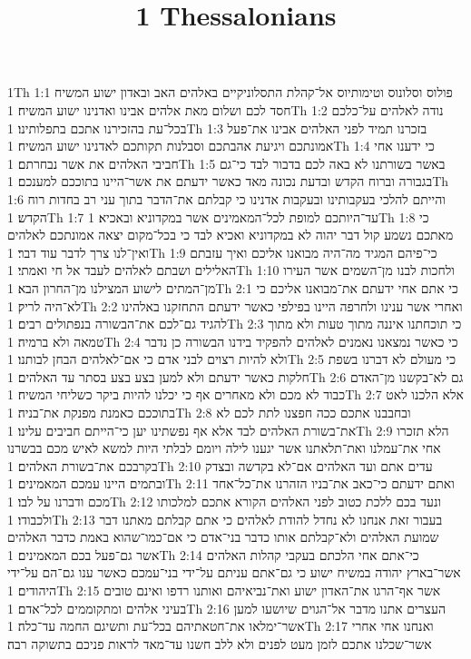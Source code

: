 

\title{1 Thessalonians}

1Th 1:1  פולוס וסלונוס וטימותיוס אל־קהלת התסלוניקיים באלהים האב ובאדון ישוע המשיח חסד לכם ושלום מאת אלהים אבינו ואדנינו ישוע המשיח׃
1Th 1:2  נודה לאלהים על־כלכם בכל־עת בהזכירנו אתכם בתפלותינו׃
1Th 1:3  בזכרנו תמיד לפני האלהים אבינו את־פעל אמונתכם ויגיעת אהבתכם וסבלנות תקותכם לאדנינו ישוע המשיח׃
1Th 1:4  כי ידענו אחי חביבי האלהים את אשר נבחרתם׃
1Th 1:5  באשר בשורתנו לא באה לכם בדבור לבד כי־גם בגבורה וברוח הקדש ובדעת נכונה מאד כאשר ידעתם את אשר־היינו בתוככם למענכם׃
1Th 1:6  והייתם להלכי בעקבותינו ובעקבות אדנינו כי קבלתם את־הדבר בתוך עני רב בחדות רוח הקדש׃
1Th 1:7  עד־היותכם למופת לכל־המאמינים אשר במקדוניא ובאכיא׃
1Th 1:8  כי מאתכם נשמע קול דבר יהוה לא במקדוניא ואכיא לבד כי בכל־מקום יצאה אמונתכם לאלהים ואין־לנו צרך לדבר עוד דבר׃
1Th 1:9  כי־פיהם המגיד מה־היה מבואנו אליכם ואיך עזבתם האלילים ושבתם לאלהים לעבד אל חי ואמתי׃
1Th 1:10  ולחכות לבנו מן־השמים אשר העירו מן־המתים לישוע המצילנו מן־החרון הבא׃
1Th 2:1  כי אתם אחי ידעתם את־מבואנו אליכם כי לא־היה לריק׃
1Th 2:2  ואחרי אשר ענינו ולחרפה היינו בפילפי כאשר ידעתם התחזקנו באלהינו להגיד גם־לכם את־הבשורה בנפתולים רבים׃
1Th 2:3  כי תוכחתנו איננה מתוך טעות ולא מתוך טמאה ולא ברמיה׃
1Th 2:4  כי כאשר נמצאנו נאמנים לאלהים להפקיד בידנו הבשורה כן נדבר ולא להיות רצוים לבני אדם כי אם־לאלהים הבחן לבותנו׃
1Th 2:5  כי מעולם לא דברנו בשפת חלקות כאשר ידעתם ולא למען בצע בצע בסתר עד האלהים׃
1Th 2:6  גם לא־בקשנו מן־האדם כבוד לא מכם ולא מאחרים אף כי יכלנו להיות ביקר כשליחי המשיח׃
1Th 2:7  אלא הלכנו לאט בתוככם כאמנת מפנקת את־בניה׃
1Th 2:8  ובחבבנו אתכם ככה חפצנו לתת לכם לא את־בשורת האלהים לבד אלא אף נפשתינו יען כי־הייתם חביבים עלינו׃
1Th 2:9  הלא תזכרו אחי את־עמלנו ואת־תלאתנו אשר יגענו לילה ויומם לבלתי היות למשא לאיש מכם בבשרנו בקרבכם את־בשורת האלהים׃
1Th 2:10  עדים אתם ועד האלהים אם־לא בקדשה ובצדק ובתמים היינו עמכם המאמינים׃
1Th 2:11  ואתם ידעתם כי־כאב את־בניו הזהרנו את־כל־אחד מכם ודברנו על לבו׃
1Th 2:12  ונעד בכם ללכת כטוב לפני האלהים הקורא אתכם למלכותו ולכבודו׃
1Th 2:13  בעבור זאת אנחנו לא נחדל להודת לאלהים כי אתם קבלתם מאתנו דבר שמועת האלהים ולא־קבלתם אותו כדבר בני־אדם כי אם־כמו־שהוא באמת כדבר האלהים אשר גם־פעל בכם המאמינים׃
1Th 2:14  כי־אתם אחי הלכתם בעקבי קהלות האלהים אשר־בארץ יהודה במשיח ישוע כי גם־אתם עניתם על־ידי בני־עמכם כאשר ענו גם־הם על־ידי היהודים׃
1Th 2:15  אשר אף־הרגו את־האדון ישוע ואת־נביאיהם ואותנו רדפו ואינם טובים בעיני אלהים ומתקוממים לכל־אדם׃
1Th 2:16  העצרים אתנו מדבר אל־הגוים שיושעו למען אשר־ימלאו את־חטאתיהם בכל־עת ותשיגם החמה עד־כלה׃
1Th 2:17  ואנחנו אחי אחרי אשר־שכלנו אתכם לזמן מעט לפנים ולא ללב חשנו עד־מאד לראות פניכם בתשוקה רבה׃
